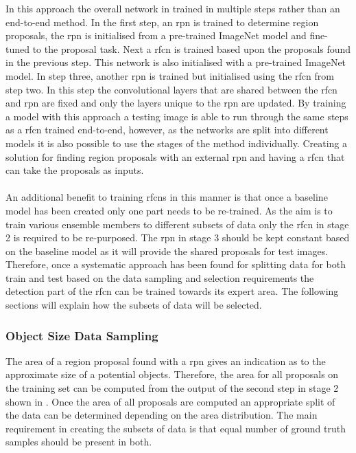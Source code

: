 \documentclass[a4paper,twoside]{article}
\begin{document}
In this approach the overall network in trained in multiple steps rather than an end-to-end method. In the first step, an \gls{rpn} is trained to determine region proposals, the \gls{rpn} is initialised from a pre-trained ImageNet model and fine-tuned to the proposal task. Next a \gls{rfcn} is trained based upon the proposals found in the previous step. This network is also initialised with a pre-trained ImageNet model. In step three, another \gls{rpn} is trained but initialised using the \gls{rfcn} from step two. In this step the convolutional layers that are shared between the \gls{rfcn} and \gls{rpn} are fixed and only the layers unique to the \gls{rpn} are updated. By training a model with this approach a testing image is able to run through the same steps as a \gls{rfcn} trained end-to-end, however, as the networks are split into different models it is also possible to use the stages of the method individually. Creating a solution for finding region proposals with an external \gls{rpn} and having a \gls{rfcn} that can take the proposals as inputs. 
\\\\
An additional benefit to training \glspl{rfcn} in this manner is that once a baseline model has been created only one part needs to be re-trained. As the aim is to train various ensemble members to different subsets of data only the \gls{rfcn} in stage 2 is required to be re-purposed. The \gls{rpn} in stage 3 should be kept constant based on the baseline model as it will provide the shared proposals for test images. Therefore, once a systematic approach has been found for splitting data for both train and test based on the data sampling and selection requirements the detection part of the \gls{rfcn} can be trained towards its expert area. The following sections will explain how the subsets of data will be selected.

\subsubsection{Object Size Data Sampling}
The area of a region proposal found with a \gls{rpn} gives an indication as to the approximate size of a potential objects. Therefore, the area for all proposals on the training set can be computed from the output of the second step in stage 2 shown in . Once the area of all proposals are computed an appropriate split of the data can be determined depending on the area distribution. The main requirement in creating the subsets of data is that equal number of ground truth samples should be present in both.
\end{document}
